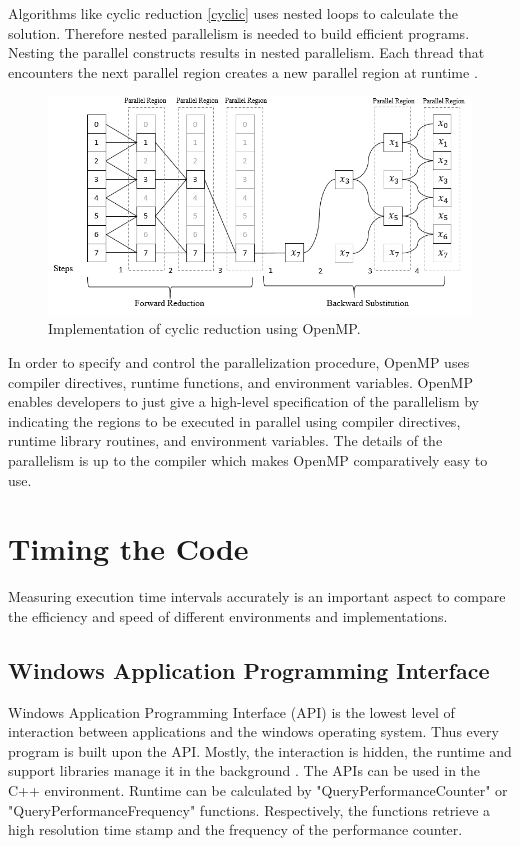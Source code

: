 \documentclass[12pt, oneside]{book}
\theoremstyle{plain}
\theoremstyle{definition}
\begin{document}
Algorithms like cyclic reduction \ref{cyclic} uses nested loops to calculate the solution. Therefore nested parallelism is needed to build efficient programs. Nesting the parallel constructs results in nested parallelism. Each thread that encounters the next parallel region creates a new parallel region at runtime \cite{openmpnext}.

\begin{figure}[!htb]
    \centering
        \includegraphics[scale=0.7]{cyclicopenmp.png}
    \caption{Implementation of cyclic reduction using OpenMP.}
\end{figure}

In order to specify and control the parallelization procedure, OpenMP uses compiler directives, runtime functions, and  environment variables. OpenMP enables developers to just give a high-level specification of the parallelism by indicating the regions to be executed in parallel using compiler directives, runtime library routines, and environment variables. The details of the parallelism is up to the compiler which makes OpenMP comparatively easy to use. 

\section{Timing the Code}
Measuring execution time intervals accurately is an important aspect to compare the efficiency and speed of different environments and implementations.

\subsection{Windows Application Programming Interface}
Windows Application Programming Interface (API) is the lowest level of interaction between applications and the windows operating system. Thus every program is built upon  the API. Mostly, the interaction is hidden, the runtime and support libraries manage it in the background \cite{windows}. The APIs can be used in the C++ environment. Runtime can be calculated by "QueryPerformanceCounter" or "QueryPerformanceFrequency"  functions. Respectively, the functions retrieve a high resolution time stamp and the frequency of the performance counter. 
\end{document}
